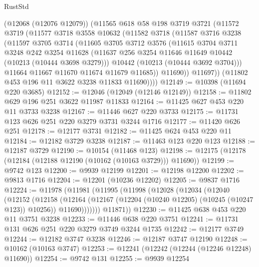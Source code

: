 \begin{lexlean}{RustStd}
\begin{coremodule}
        (@12068 (@12076 @12079))
        (@11565
          @618
          @58
          @198
          @3719
          @3721
          (@11572
            @3719
            (@11577
              @3718
              @3558
              @10632
              (@11582
                @3718
                (@11587
                  @3716
                  @3238
                  (@11597
                    @3705
                    @3714
                    (@11605
                      @3705
                      @3712
                      @3576
                      (@11615
                        @3704
                        @3711
                        @3248
                        @242
                        @3254
                        @11628
                        (@11637 @256 @3254 @11646 @11649 @10442 (@10213 (@10444 @3698 @3279)))
                        @10442
                        (@10213 (@10444 @3692 @3704)))
                      @11664
                      @11667
                      @11670
                      @11674
                      @11679
                      @11685))
                  @11690))
              @11697))
          (@11802 @453 @196 @11 @3622 @3238 @11833 @11690))))
@12149 := @10398 (@11694 @220 @3685)
@12152 := @12046 (@12049 (@12146 @12149))
@12158 := @11802 @629 @196 @251 @3622 @11987 @11833
@12164 := @11425 @627 @453 @220 @11 @3733 @3238
@12167 := @11446 @627 @220 @3733
@12175 := @11731 @123 @626 @251 @220 @3279 @3731 @3244 @1716
@12177 := @11420 @626 @251
@12178 := @12177 @3731
@12182 := @11425 @624 @453 @220 @11
@12184 := @12182 @3729 @3238
@12187 := @11463 @123 @220 @123
@12188 := @12187 @3729
@12190 := @10154 (@11468 @123)
@12198 := @12175 (@12178 (@12184 (@12188 @12190 (@10162 (@10163 @3729))) @11690))
@12199 := @9742 @123
@12200 := @9939 @12199
@12201 := @12198 @12200
@12202 := @9813 @1716
@12204 := @12201 (@10236 @12202)
@12205 := @9837 @1716
@12224 := @11978
    (@11981
      (@11995
        (@11998
          (@12028
            (@12034
              (@12040
                (@12152
                  (@12158
                    (@12164
                      (@12167 (@12204 (@10240 @12205) (@10245 (@10247 @123)) @10256))
                      @11690)))))))
        @11871))
@12230 := @11425 @638 @453 @220 @11 @3751 @3238
@12233 := @11446 @638 @220 @3751
@12241 := @11731 @131 @626 @251 @220 @3279 @3749 @3244 @1735
@12242 := @12177 @3749
@12244 := @12182 @3747 @3238
@12246 := @12187 @3747 @12190
@12248 := @10162 (@10163 @3747)
@12253 := @12241 (@12242 (@12244 (@12246 @12248) @11690))
@12254 := @9742 @131
@12255 := @9939 @12254

\end{coremodule}
\end{lexlean}
